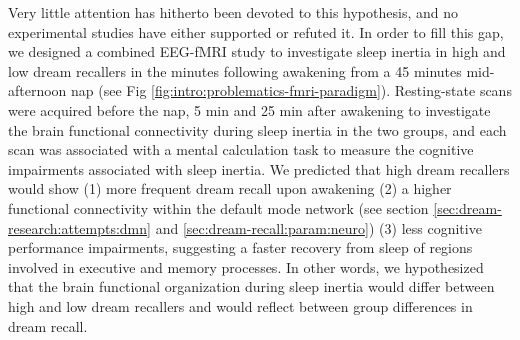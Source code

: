 Very little attention has hitherto been devoted to this hypothesis, and no experimental studies have either supported or refuted it. In order to fill this gap, we designed a combined EEG-fMRI study to investigate sleep inertia in high and low dream recallers in the minutes following awakening from a 45 minutes mid-afternoon nap (see Fig \ref{fig:intro:problematics-fmri-paradigm}). Resting-state scans were acquired before the nap, 5 min and 25 min after awakening to investigate the brain functional connectivity during sleep inertia in the two groups, and each scan was associated with a mental calculation task to measure the cognitive impairments associated with sleep inertia. We predicted that high dream recallers would show (1) more frequent dream recall upon awakening (2) a higher functional connectivity within the default mode network (see section \ref{sec:dream-research:attempts:dmn} and \ref{sec:dream-recall:param:neuro}) (3) less cognitive performance impairments, suggesting a faster recovery from sleep of regions involved in executive and memory processes. In other words, we hypothesized that the brain functional organization during sleep inertia would differ between high and low dream recallers and would reflect between group differences in dream recall.

